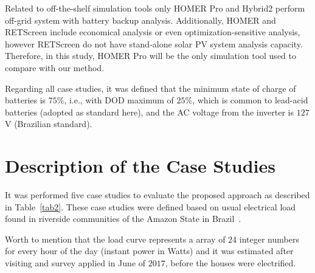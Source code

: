 Related to off-the-shelf simulation tools only HOMER Pro and Hybrid2 perform off-grid system with battery backup analysis. Additionally, HOMER and RETScreen include economical analysis or even optimization-sensitive analysis, however RETScreen do not have stand-alone solar PV system analysis capacity. Therefore, in this study, HOMER Pro will be the only simulation tool used to compare with our method.  

Regarding all case studies, it was defined that the minimum state of charge of batteries is $75$\%, i.e., with DOD maximum of $25$\%, which is common to lead-acid batteries (adopted as standard here), and the AC voltage from the inverter is $127$ V (Brazilian standard).


\section{Description of the Case Studies}

It was performed five case studies to evaluate the proposed approach as described in Table~\ref{tab2}. %
These case studies were defined based on usual electrical load found in riverside communities of the Amazon State in Brazil~\cite{abs-1811-09438, Agrener2013}.

Worth to mention that the load curve represents a array of $24$ integer numbers for every hour of the day (instant power in Watts) and it was estimated after visiting and survey applied in June of $2017$, before the houses were electrified.

